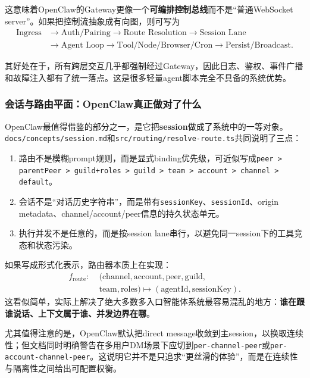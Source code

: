 \documentclass[12pt,a4paper]{article}
\begin{document}
这意味着OpenClaw的Gateway更像一个\textbf{可编排控制总线}而不是“普通WebSocket server”。如果把控制流抽象成有向图，则可写为
\begin{equation}
\begin{aligned}
\text{Ingress}
&\rightarrow \text{Auth/Pairing}
\rightarrow \text{Route Resolution}
\rightarrow \text{Session Lane} \\
&\rightarrow \text{Agent Loop}
\rightarrow \text{Tool/Node/Browser/Cron}
\rightarrow \text{Persist/Broadcast}.
\end{aligned}
\end{equation}

其好处在于，所有跨层交互几乎都强制经过Gateway，因此日志、鉴权、事件广播和故障注入都有了统一落点。这是很多轻量agent脚本完全不具备的系统优势。

\subsubsection{会话与路由平面：OpenClaw真正做对了什么}

OpenClaw最值得借鉴的部分之一，是它把\textbf{session}做成了系统中的一等对象。\texttt{docs/concepts/session.md}和\texttt{src/routing/resolve-route.ts}共同说明了三点：

\begin{enumerate}
    \item 路由不是模糊prompt规则，而是显式binding优先级，可近似写成\texttt{peer > parentPeer > guild+roles > guild > team > account > channel > default}。
    \item 会话不是“对话历史字符串”，而是带有\texttt{sessionKey}、\texttt{sessionId}、origin metadata、channel/account/peer信息的持久状态单元。
    \item 执行并发不是任意的，而是按session lane串行，以避免同一session下的工具竞态和状态污染。
\end{enumerate}

如果写成形式化表示，路由器本质上在实现：
\begin{equation}
\begin{aligned}
f_{\text{route}}:\;&(\text{channel},\text{account},\text{peer},\text{guild}, \\
&\text{team},\text{roles})
\mapsto
(\text{agentId}, \text{sessionKey}).
\end{aligned}
\end{equation}
这看似简单，实际上解决了绝大多数多入口智能体系统最容易混乱的地方：\textbf{谁在跟谁说话、上下文属于谁、并发边界在哪}。

尤其值得注意的是，OpenClaw默认把direct message收敛到主session，以换取连续性；但文档同时明确警告在多用户DM场景下应切到\texttt{per-channel-peer}或\texttt{per-account-channel-peer}。这说明它并不是只追求“更丝滑的体验”，而是在连续性与隔离性之间给出可配置权衡。
\end{document}
